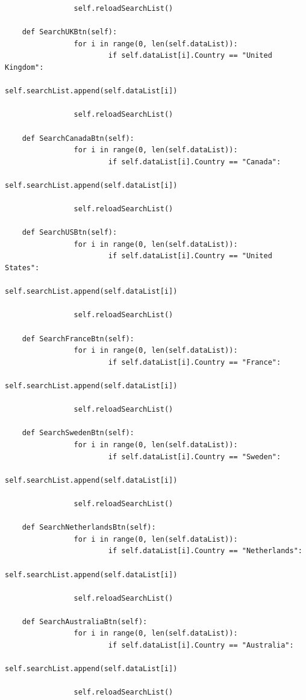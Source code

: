 \documentclass[12pt]{article}
\begin{document}
\begin{verbatim}
                self.reloadSearchList()

    def SearchUKBtn(self):
                for i in range(0, len(self.dataList)):
                        if self.dataList[i].Country == "United Kingdom":
                                self.searchList.append(self.dataList[i])
                
                self.reloadSearchList()

    def SearchCanadaBtn(self):
                for i in range(0, len(self.dataList)):
                        if self.dataList[i].Country == "Canada":
                                self.searchList.append(self.dataList[i])
                
                self.reloadSearchList()

    def SearchUSBtn(self):
                for i in range(0, len(self.dataList)):
                        if self.dataList[i].Country == "United States":
                                self.searchList.append(self.dataList[i])
                
                self.reloadSearchList()

    def SearchFranceBtn(self):
                for i in range(0, len(self.dataList)):
                        if self.dataList[i].Country == "France":
                                self.searchList.append(self.dataList[i])
                
                self.reloadSearchList()

    def SearchSwedenBtn(self):
                for i in range(0, len(self.dataList)):
                        if self.dataList[i].Country == "Sweden":
                                self.searchList.append(self.dataList[i])
                
                self.reloadSearchList()

    def SearchNetherlandsBtn(self):
                for i in range(0, len(self.dataList)):
                        if self.dataList[i].Country == "Netherlands":
                                self.searchList.append(self.dataList[i])
                
                self.reloadSearchList()

    def SearchAustraliaBtn(self):
                for i in range(0, len(self.dataList)):
                        if self.dataList[i].Country == "Australia":
                                self.searchList.append(self.dataList[i])
                
                self.reloadSearchList()


\end{verbatim}
\end{document}

